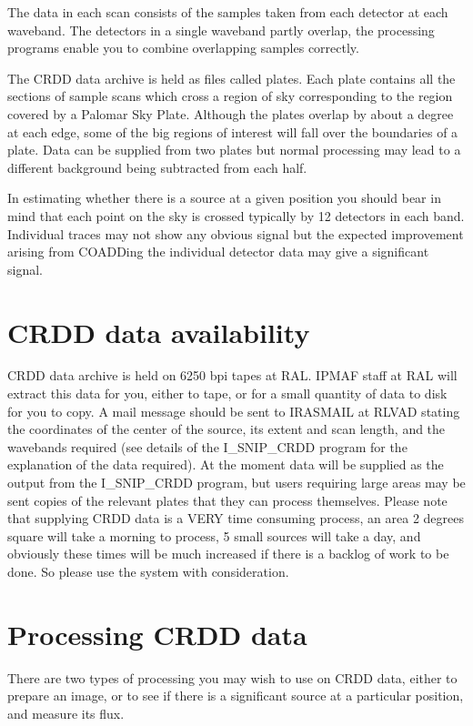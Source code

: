 The data in each scan consists of the samples taken from each detector at each
waveband. The detectors in a single waveband partly overlap, the processing
programs enable you to combine overlapping samples correctly. 

The CRDD data archive is held as files called plates. Each plate contains all
the sections of sample scans which cross a region of sky corresponding to the
region covered by a Palomar Sky Plate. Although the plates overlap by about a
degree at each edge, some of the big regions of interest will fall over the
boundaries of a plate. Data can be supplied from two plates but normal 
processing may lead to a different background being subtracted from each half.

In estimating whether there is a source at a given position you should bear in
mind that each point on the sky is crossed typically by 12 detectors in each 
band. Individual traces may not show any obvious signal but the expected 
improvement arising from COADDing the individual detector data may give a 
significant signal. 

\section {CRDD data availability}

CRDD data archive is held on 6250 bpi tapes at RAL. IPMAF staff at RAL will
extract this data for you, either to tape, or for a small quantity of data to 
disk for you to copy. A mail message should be sent to IRASMAIL at RLVAD 
stating the coordinates of the center of the source, its extent and scan 
length, and the wavebands required (see details of the I\_SNIP\_CRDD program 
for the explanation of the data required). At the moment data will be supplied 
as the output from the I\_SNIP\_CRDD program, but users requiring large areas 
may be sent copies of the relevant plates that they can process themselves.
Please note that supplying CRDD data is a VERY time consuming 
process, an area 2 degrees square will take a morning to process, 5 small
sources will take a day, and obviously these times will be much increased if
there is a backlog of work to be done. So please use the system with
consideration.

\section {Processing CRDD data}

There are two types of processing you may wish to use on CRDD data, either to 
prepare an image, or to see if there is a significant source at a particular
position, and measure its flux.

